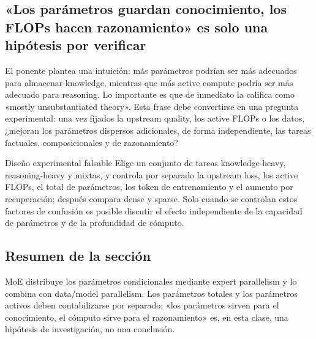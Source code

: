 \subsection{«Los parámetros guardan conocimiento, los FLOPs hacen razonamiento» es solo una hipótesis por verificar}

El ponente plantea una intuición: más parámetros podrían ser más adecuados para almacenar knowledge, mientras que más active compute podría ser más adecuado para reasoning. Lo importante es que de inmediato la califica como «mostly unsubstantiated theory». Esta frase debe convertirse en una pregunta experimental: una vez fijados la upstream quality, los active FLOPs o los datos, ¿mejoran los parámetros dispersos adicionales, de forma independiente, las tareas factuales, composicionales y de razonamiento?



\begin{importantbox}{Diseño experimental falsable}
Elige un conjunto de tareas knowledge-heavy, reasoning-heavy y mixtas, y controla por separado la upstream loss, los active FLOPs, el total de parámetros, los token de entrenamiento y el aumento por recuperación; después compara dense y sparse. Solo cuando se controlan estos factores de confusión es posible discutir el efecto independiente de la capacidad de parámetros y de la profundidad de cómputo.
\end{importantbox}

\subsection{Resumen de la sección}

MoE distribuye los parámetros condicionales mediante expert parallelism y lo combina con data/model parallelism. Los parámetros totales y los parámetros activos deben contabilizarse por separado; «los parámetros sirven para el conocimiento, el cómputo sirve para el razonamiento» es, en esta clase, una hipótesis de investigación, no una conclusión.
